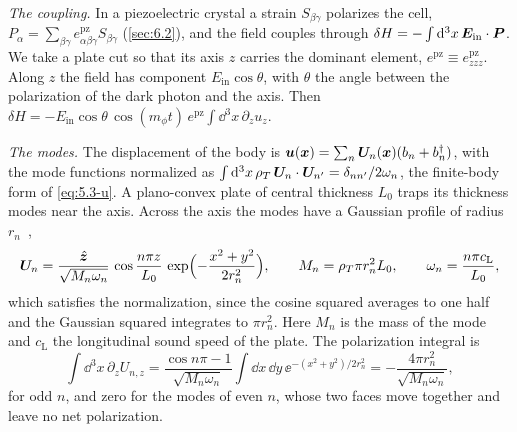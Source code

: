 \emph{The coupling.} In a piezoelectric crystal a strain $S_{\beta\gamma}$ polarizes the cell, $P_\alpha = \sum_{\beta\gamma}e^{\mathrm{pz}}_{\alpha\beta\gamma}S_{\beta\gamma}$ (\cref{sec:6.2}), and the field couples through $\delta H = -\int\mathrm{d}^3x\,\bm{E}_{\mathrm{in}}\cdot\bm{P}$. We take a plate cut so that its axis $z$ carries the dominant element, $e^{\mathrm{pz}} \equiv e^{\mathrm{pz}}_{zzz}$. Along $z$ the field has component $E_{\mathrm{in}}\cos\theta$, with $\theta$ the angle between the polarization of the dark photon and the axis. Then $\delta H = -E_{\mathrm{in}}\cos\theta\,\cos(m_\phi t)\,e^{\mathrm{pz}}\int\dd^3x\,\partial_zu_z$.

\emph{The modes.} The displacement of the body is $\bm{u}(\bm{x}) = \sum_n\bm{U}_n(\bm{x})(b_n + b_n^\dagger)$, with the mode functions normalized as $\int\mathrm{d}^3x\,\rho_T\,\bm{U}_n\cdot\bm{U}_{n'} = \delta_{nn'}/2\omega_n$, the finite-body form of \cref{eq:5.3-u}. A plano-convex plate of central thickness $L_0$ traps its thickness modes near the axis. Across the axis the modes have a Gaussian profile of radius $r_n$~\cite[Eqs.~(2), (3)]{trickle2025piezoelectric},
\begin{equation*}
  \bm{U}_n = \frac{\hat{\bm{z}}}{\sqrt{M_n\omega_n}}\,\cos\frac{n\pi z}{L_0}\,\exp\Bigl(-\frac{x^2 + y^2}{2r_n^2}\Bigr) ,
  \qquad M_n = \rho_T\pi r_n^2L_0 ,
  \qquad \omega_n = \frac{n\pi c_{\mathrm{L}}}{L_0} ,
\end{equation*}
which satisfies the normalization, since the cosine squared averages to one half and the Gaussian squared integrates to $\pi r_n^2$. Here $M_n$ is the mass of the mode and $c_{\mathrm{L}}$ the longitudinal sound speed of the plate. The polarization integral is
\begin{equation*}
  \int\dd^3x\,\partial_zU_{n,z} = \frac{\cos n\pi - 1}{\sqrt{M_n\omega_n}}\int\dd x\,\dd y\,\ee^{-(x^2 + y^2)/2r_n^2} = -\frac{4\pi r_n^2}{\sqrt{M_n\omega_n}} ,
\end{equation*}
for odd $n$, and zero for the modes of even $n$, whose two faces move together and leave no net polarization.

